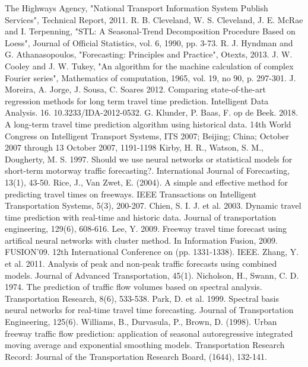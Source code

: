 \documentclass[conference, letterpaper]{IEEEtran}
\begin{document}
\begin{thebibliography}{00}
 The Highways Agency, "National Transport Information System Publish Services", Technical Report, 2011. 
 R. B. Cleveland, W. S. Cleveland, J. E. McRae and I. Terpenning, "STL: A Seasonal-Trend Decomposition Procedure Based on Loess", Journal of Official Statistics, vol. 6, 1990, pp. 3-73.
 R. J. Hyndman and G. Athanasopoulos, "Forecasting: Principles and Practice", Otexts, 2013.
 J. W. Cooley and J. W. Tukey, "An algorithm for the machine calculation of complex Fourier series", Mathematics of computation, 1965, vol. 19, no 90, p. 297-301.
 J. Moreira, A. Jorge, J. Sousa, C. Soares 2012. Comparing state-of-the-art regression methods for long term travel time prediction. Intelligent Data Analysis. 16. 10.3233/IDA-2012-0532. 
 G. Klunder, P. Baas, F. op de Beek. 2018. A long-term travel time prediction algorithm using historical data. 14th World Congress on Intelligent Transport Systems, ITS 2007; Beijing; China; October 2007 through 13 October 2007, 1191-1198
 Kirby, H. R., Watson, S. M., Dougherty, M. S. 1997. Should we use neural networks or statistical models for short-term motorway traffic forecasting?. International Journal of Forecasting, 13(1), 43-50.
 Rice, J., Van Zwet, E. (2004). A simple and effective method for predicting travel times on freeways. IEEE Transactions on Intelligent Transportation Systems, 5(3), 200-207.
 Chien, S. I. J. et al. 2003. Dynamic travel time prediction with real-time and historic data. Journal of transportation engineering, 129(6), 608-616.
 Lee, Y. 2009. Freeway travel time forecast using artifical neural networks with cluster method. In Information Fusion, 2009. FUSION'09. 12th International Conference on (pp. 1331-1338). IEEE.
 Zhang, Y. et al. 2011. Analysis of peak and non‐peak traffic forecasts using combined models. Journal of Advanced Transportation, 45(1).
 Nicholson, H., Swann, C. D. 1974. The prediction of traffic flow volumes based on spectral analysis. Transportation Research, 8(6), 533-538.
 Park, D. et al. 1999. Spectral basis neural networks for real-time travel time forecasting. Journal of Transportation Engineering, 125(6).
 Williams, B., Durvasula, P., Brown, D. (1998). Urban freeway traffic flow prediction: application of seasonal autoregressive integrated moving average and exponential smoothing models. Transportation Research Record: Journal of the Transportation Research Board, (1644), 132-141.

\end{thebibliography}
\end{document}
